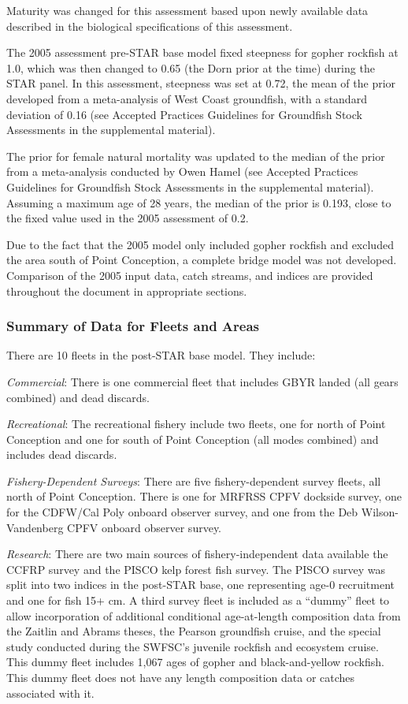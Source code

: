 \documentclass[12pt,]{article}
\begin{document}
Maturity was changed for this assessment based upon newly available data
described in the biological specifications of this assessment.

The 2005 assessment pre-STAR base model fixed steepness for gopher
rockfish at 1.0, which was then changed to 0.65 (the Dorn prior at the
time) during the STAR panel. In this assessment, steepness was set at
0.72, the mean of the prior developed from a meta-analysis of West Coast
groundfish, with a standard deviation of 0.16 (see Accepted Practices
Guidelines for Groundfish Stock Assessments in the supplemental
material).

The prior for female natural mortality was updated to the median of the
prior from a meta-analysis conducted by Owen Hamel (see Accepted
Practices Guidelines for Groundfish Stock Assessments in the
supplemental material). Assuming a maximum age of 28 years, the median
of the prior is 0.193, close to the fixed value used in the 2005
assessment of 0.2.

Due to the fact that the 2005 model only included gopher rockfish and
excluded the area south of Point Conception, a complete bridge model was
not developed. Comparison of the 2005 input data, catch streams, and
indices are provided throughout the document in appropriate sections.

\subsubsection{Summary of Data for Fleets and
Areas}\label{summary-of-data-for-fleets-and-areas}

There are 10 fleets in the post-STAR base model. They include:

\emph{Commercial}: There is one commercial fleet that includes GBYR
landed (all gears combined) and dead discards.

\emph{Recreational}: The recreational fishery include two fleets, one
for north of Point Conception and one for south of Point Conception (all
modes combined) and includes dead discards.

\emph{Fishery-Dependent Surveys}: There are five fishery-dependent
survey fleets, all north of Point Conception. There is one for MRFRSS
CPFV dockside survey, one for the CDFW/Cal Poly onboard observer survey,
and one from the Deb Wilson-Vandenberg CPFV onboard observer survey.

\emph{Research}: There are two main sources of fishery-independent data
available the CCFRP survey and the PISCO kelp forest fish survey. The
PISCO survey was split into two indices in the post-STAR base, one
representing age-0 recruitment and one for fish 15+ cm. A third survey
fleet is included as a ``dummy'' fleet to allow incorporation of
additional conditional age-at-length composition data from the Zaitlin
and Abrams theses, the Pearson groundfish cruise, and the special study
conducted during the SWFSC's juvenile rockfish and ecosystem cruise.
This dummy fleet includes 1,067 ages of gopher and black-and-yellow
rockfish. This dummy fleet does not have any length composition data or
catches associated with it.
\end{document}
